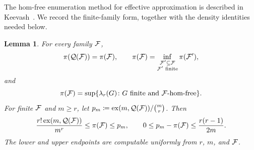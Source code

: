 \documentclass[10pt]{article}
\numberwithin{equation}{section}
\newtheorem{lemma}[lemma]{Lemma}\aliascntresetthe{lemma}
\theoremstyle{definition}
\newcommand{\cQ}{\mathcal Q}\newcommand{\cR}{\mathcal R}\newcommand{\cS}{\mathcal S}
\newcommand{\ex}{\operatorname{ex}}\newcommand{\supp}{\operatorname{supp}}
\begin{document}
The hom-free enumeration method for effective approximation is described in Keevash~\cite[Section~2]{Keevash2011}. We record the finite-family form, together with the density identities needed below.
\begin{lemma}\label{prop:approx}
For every family $\mathcal F$,
\begin{equation}\label{eq:BS}
 \pi(\cQ(\cF))=\pi(\cF),\qquad
 \pi(\cF)=\inf_{\substack{\cF'\subseteq\cF\\\cF'\text{ finite}}}\pi(\cF'),
\end{equation}
and
\begin{equation}\label{eq:lagdensity}
 \pi(\mathcal F)=\sup\{\lambda_r(G)\colon G\text{ finite and }\mathcal F\text{-hom-free}\}.
\end{equation}
For finite $\mathcal F$ and $m\ge r$, let $p_m\coloneqq\ex(m,\cQ(\cF))/\binom mr$. Then
\begin{equation}\label{eq:approx}
 \frac{r!\ex(m,\cQ(\cF))}{m^r}\le\pi(\cF)\le p_m,
 \qquad 0\le p_m-\pi(\cF)\le\frac{r(r-1)}{2m}.
\end{equation}
The lower and upper endpoints are computable uniformly from $r$, $m$, and $\mathcal F$.
\end{lemma}
\end{document}
